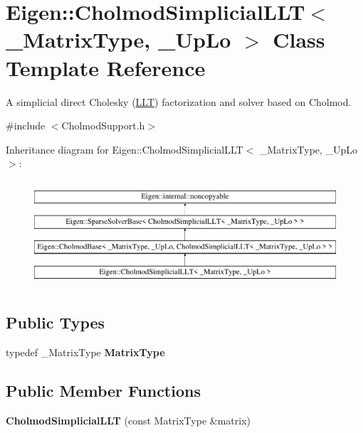 \hypertarget{class_eigen_1_1_cholmod_simplicial_l_l_t}{}\section{Eigen\+::Cholmod\+Simplicial\+L\+LT$<$ \+\_\+\+Matrix\+Type, \+\_\+\+Up\+Lo $>$ Class Template Reference}
\label{class_eigen_1_1_cholmod_simplicial_l_l_t}


A simplicial direct Cholesky (\mbox{\hyperlink{class_eigen_1_1_l_l_t}{L\+LT}}) factorization and solver based on Cholmod.  




{\ttfamily \#include $<$Cholmod\+Support.\+h$>$}

Inheritance diagram for Eigen\+::Cholmod\+Simplicial\+L\+LT$<$ \+\_\+\+Matrix\+Type, \+\_\+\+Up\+Lo $>$\+:\begin{figure}[H]
\begin{center}
\leavevmode
\includegraphics[height=4.000000cm]{class_eigen_1_1_cholmod_simplicial_l_l_t}
\end{center}
\end{figure}
\subsection*{Public Types}
\begin{DoxyCompactItemize}
\item 
\mbox{\label{class_eigen_1_1_cholmod_simplicial_l_l_t_a88c7441fa03aed599eba4f29492e7fe4}} 
typedef \+\_\+\+Matrix\+Type {\bfseries Matrix\+Type}
\end{DoxyCompactItemize}
\subsection*{Public Member Functions}
\begin{DoxyCompactItemize}
\item 
\mbox{\label{class_eigen_1_1_cholmod_simplicial_l_l_t_a5f0aaf18cba4b276da9946f968fbf14b}} 
{\bfseries Cholmod\+Simplicial\+L\+LT} (const Matrix\+Type \&matrix)
\end{DoxyCompactItemize}
